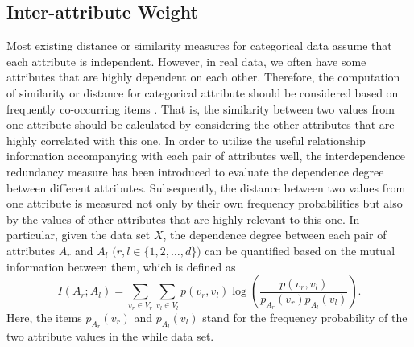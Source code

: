 \documentclass[review]{elsarticle}
\begin{document}
\subsection{Inter-attribute Weight}
Most existing distance or similarity measures for categorical data assume that each attribute is independent. However, in real data, we often have some attributes that are highly dependent on each other. Therefore, the computation of similarity or distance for categorical attribute should be considered based on frequently co-occurring items \cite{Ganti1999CACTUS}. That is, the similarity between two values from one attribute should be calculated by considering the other attributes that are highly correlated with this one. In order to utilize the useful relationship information accompanying with each pair of attributes well, the interdependence redundancy measure \cite{Au2005Attribute} has been introduced to evaluate the dependence degree between different attributes. Subsequently, the distance between two values from one attribute is measured not only by their own frequency probabilities but also by the values of other attributes that are highly relevant to this one. In particular, given the data set $X$, the dependence degree between each pair of attributes $A_r$ and $A_l$ $\mathbf (r,l \in \{1,2,\dots,d\})$ can be quantified based on the mutual information \cite{MacKay2003Information} between them, which is defined as
\begin{equation}
I(A_r;A_l) = \sum_{v_{r} \in V_r}\sum_{v_{l} \in V_l}p(v_{r},v_{l})\log(\frac{p(v_{r},v_{l})}{p_{A_r}(v_{r})p_{A_l}(v_{l})}).
\label{equ10}
\end{equation}
Here, the items $p_{A_r}(v_{r})$ and $p_{A_l}(v_{l})$ stand for the frequency probability of the two attribute values in the while data set.
\end{document}
